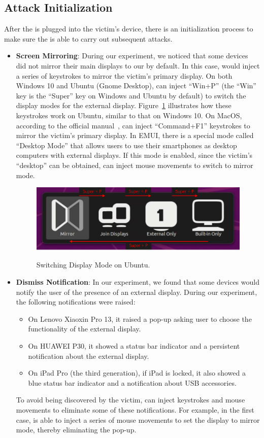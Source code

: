 \subsection{Attack Initialization}
\label{subsec:attack_init}
After the \tool is plugged into the victim's device, there is an initialization process to make sure the \tool is able to carry out subsequent attacks.
\begin{itemize}
	\item \textbf{Screen Mirroring}:
		During our experiment, we noticed that some devices did not mirror their main displays to our \tool by default. In this case, \tool would inject a series of keystrokes to mirror the victim's primary display. On both Windows 10 and Ubuntu (Gnome Desktop), \tool can inject ``Win+P'' (the ``Win'' key is the ``Super'' key on Windows and Ubuntu by default) to switch the display modes for the external display. Figure~\ref{fig:ubuntu_switch} illustrates how these keystrokes work on Ubuntu, similar to that on Windows 10. On MacOS, according to the official manual~\cite{appleman}, \tool can inject \mbox{``Command+F1''} keystrokes to mirror the victim's primary display. In EMUI, there is a special mode called ``Desktop Mode'' that allows users to use their smartphones as desktop computers with external displays. If this mode is enabled, since the victim's ``desktop'' can be obtained, \tool can inject mouse movements to switch to mirror mode.
		\begin{figure}[H]
			\includegraphics[width=\linewidth]{./Figs/ubuntu_switch.png}\\
			\caption{Switching Display Mode on Ubuntu.}
			\label{fig:ubuntu_switch}
		\end{figure}
	\item \textbf{Dismiss Notification}:
		In our experiment, we found that some devices would notify the user of the presence of an external display. During our experiment, the following notifications were raised:
		\begin{itemize}
		 \item On Lenovo Xiaoxin Pro 13, it raised a pop-up asking user to choose the functionality of the external display.
		 \item On HUAWEI P30, it showed a status bar indicator and a persistent notification about the external display.
		 \item On iPad Pro (the third generation), if iPad is locked, it also showed a blue status bar indicator and a notification about \ac{USB} accessories.
		\end{itemize}
		To avoid being discovered by the victim, \tool can inject keystrokes and mouse movements to eliminate some of these notifications.
		For example, in the first case, \tool is able to inject a series of mouse movements to set the display to mirror mode, thereby eliminating the pop-up.
\end{itemize}
